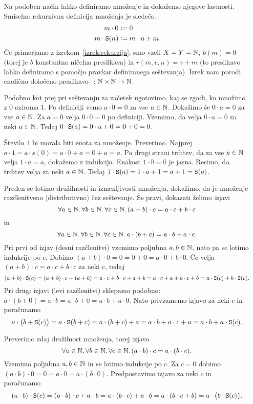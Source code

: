 Na podoben način lahko definiramo množenje in dokažemo njegove lastnosti. Smiselna rekurzivna definicija množenja je sledeča.
\begin{align*}
m \cdot 0 &\mathrel{\mathop:}= 0 \\
m \cdot \mathtt{S}(n) &\mathrel{\mathop:}= m \cdot n + m
\end{align*}
Če primerjamo z izrekom~\ref{izrek:rekurzija}, smo vzeli $X = Y = \mathbb{N}$, $b(m) = 0$ (torej je $b$ konstantna ničelna preslikava) in $r(m, v, n) = v + m$ (to preslikavo lahko definiramo s pomočjo pravkar definiranega seštevanja). Izrek nam porodi enolično določeno preslikavo $\cdot\colon \mathbb{N} \times \mathbb{N} \to \mathbb{N}$.

Podobno kot prej pri seštevanju za začetek ugotovimo, kaj se zgodi, ko množimo z $0$ oziroma $1$. Po definiciji vemo $a \cdot 0 = 0$ za vse $a \in \mathbb{N}$. Dokažimo še $0 \cdot a = 0$ za vse $a \in \mathbb{N}$. Za $a = 0$ velja $0 \cdot 0 = 0$ po definiciji. Vzemimo, da velja $0 \cdot a = 0$ za neki $a \in \mathbb{N}$. Tedaj $0 \cdot \mathtt{S}(a) = 0 \cdot a + 0 = 0 + 0 = 0$.

Število $1$ bi morala biti enota za množenje. Preverimo. Najprej $a \cdot 1 = a \cdot s(0) = a \cdot 0 + a = 0 + a = a$. Po drugi strani trditev, da za vse $a \in \mathbb{N}$ velja $1 \cdot a = a$, dokažemo z indukcijo. Enakost $1 \cdot 0 = 0$ je jasna. Recimo, da trditev velja za neki $a \in \mathbb{N}$. Tedaj $1 \cdot \mathtt{S}(a) = 1 \cdot a + 1 = a + 1 = \mathtt{S}(a)$.

Preden se lotimo družilnosti in izmenljivosti množenja, dokažimo, da je množenje razčlenitveno (distributivno) čez seštevanje. Se pravi, dokazati želimo izjavi
\[\forall a \in \mathbb{N} .\,\forall b \in \mathbb{N} .\,\forall c \in \mathbb{N} .\,{(a + b) \cdot c = a \cdot c  + b \cdot c}\]
in
\[\forall a \in \mathbb{N} .\,\forall b \in \mathbb{N} .\,\forall c \in \mathbb{N} .\,{a \cdot (b + c) = a \cdot b + a \cdot c}.\]
Pri prvi od izjav (desni razčlenitvi) vzemimo poljubna $a, b \in \mathbb{N}$, nato pa se lotimo indukcije po $c$. Dobimo $(a + b) \cdot 0 = 0 = 0 + 0 = a \cdot 0 + b \cdot 0$. Če velja $(a + b) \cdot c = a \cdot c  + b \cdot c$ za neki $c$, tedaj
\[(a + b) \cdot \mathtt{S}(c) = (a + b) \cdot c + (a + b) = a \cdot c + b \cdot c + a + b = a \cdot c + a + b \cdot c + b = a \cdot \mathtt{S}(c) + b \cdot \mathtt{S}(c).\]
Pri drugi izjavi (levi razčlenitvi) sklepamo podobno: $a \cdot (b + 0) = a \cdot b = a \cdot b + 0 = a \cdot b + a \cdot 0$. Nato privzamemo izjavo za neki $c$ in poračunamo
\[a \cdot \big(b + \mathtt{S}(c)\big) = a \cdot \mathtt{S}(b + c) = a \cdot (b + c) + a = a \cdot b + a \cdot c + a = a \cdot b + a \cdot \mathtt{S}(c).\]

Preverimo zdaj družilnost množenja, torej izjavo
\[\forall a \in \mathbb{N} .\,\forall b \in \mathbb{N} .\,\forall c \in \mathbb{N} .\,{(a \cdot b) \cdot c = a \cdot (b \cdot c)}.\]
Vzemimo poljubna $a, b \in \mathbb{N}$ in se lotimo indukcije po $c$. Za $c = 0$ dobimo $(a \cdot b) \cdot 0 = 0 = a \cdot 0 = a \cdot (b \cdot 0)$. Predpostavimo izjavo za neki $c$ in poračunamo
\[(a \cdot b) \cdot \mathtt{S}(c) = (a \cdot b) \cdot c + a \cdot b = a \cdot (b \cdot c) + a \cdot b = a \cdot (b \cdot c + b) = a \cdot \big(b \cdot \mathtt{S}(c)\big).\]

